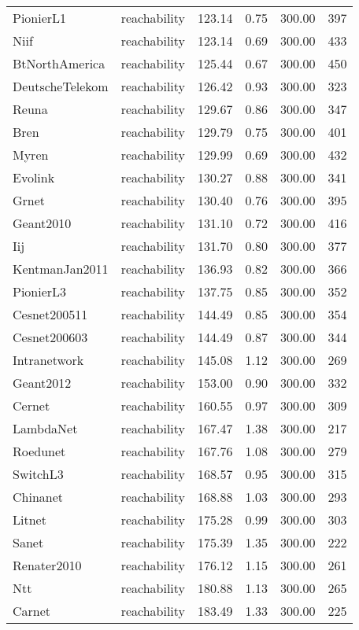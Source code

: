 \begin{tabular}{llrrrr}
PionierL1 & reachability & 123.14 & 0.75 & 300.00 & 397 \\
Niif & reachability & 123.14 & 0.69 & 300.00 & 433 \\
BtNorthAmerica & reachability & 125.44 & 0.67 & 300.00 & 450 \\
DeutscheTelekom & reachability & 126.42 & 0.93 & 300.00 & 323 \\
Reuna & reachability & 129.67 & 0.86 & 300.00 & 347 \\
Bren & reachability & 129.79 & 0.75 & 300.00 & 401 \\
Myren & reachability & 129.99 & 0.69 & 300.00 & 432 \\
Evolink & reachability & 130.27 & 0.88 & 300.00 & 341 \\
Grnet & reachability & 130.40 & 0.76 & 300.00 & 395 \\
Geant2010 & reachability & 131.10 & 0.72 & 300.00 & 416 \\
Iij & reachability & 131.70 & 0.80 & 300.00 & 377 \\
KentmanJan2011 & reachability & 136.93 & 0.82 & 300.00 & 366 \\
PionierL3 & reachability & 137.75 & 0.85 & 300.00 & 352 \\
Cesnet200511 & reachability & 144.49 & 0.85 & 300.00 & 354 \\
Cesnet200603 & reachability & 144.49 & 0.87 & 300.00 & 344 \\
Intranetwork & reachability & 145.08 & 1.12 & 300.00 & 269 \\
Geant2012 & reachability & 153.00 & 0.90 & 300.00 & 332 \\
Cernet & reachability & 160.55 & 0.97 & 300.00 & 309 \\
LambdaNet & reachability & 167.47 & 1.38 & 300.00 & 217 \\
Roedunet & reachability & 167.76 & 1.08 & 300.00 & 279 \\
SwitchL3 & reachability & 168.57 & 0.95 & 300.00 & 315 \\
Chinanet & reachability & 168.88 & 1.03 & 300.00 & 293 \\
Litnet & reachability & 175.28 & 0.99 & 300.00 & 303 \\
Sanet & reachability & 175.39 & 1.35 & 300.00 & 222 \\
Renater2010 & reachability & 176.12 & 1.15 & 300.00 & 261 \\
Ntt & reachability & 180.88 & 1.13 & 300.00 & 265 \\
Carnet & reachability & 183.49 & 1.33 & 300.00 & 225 \\

\end{tabular}
